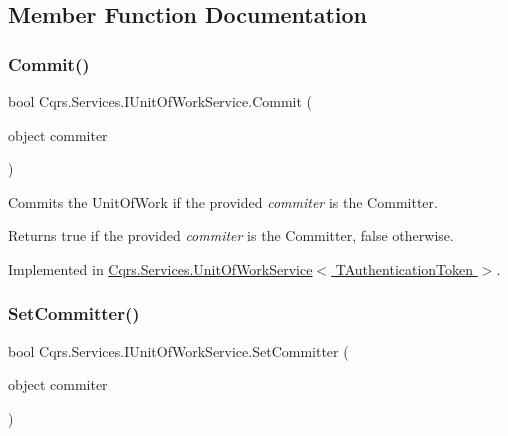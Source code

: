 \subsection{Member Function Documentation}
\mbox{\label{interfaceCqrs_1_1Services_1_1IUnitOfWorkService_a3bd8a6a931fc6f457d136d979d26cead_a3bd8a6a931fc6f457d136d979d26cead}} 
\subsubsection{\texorpdfstring{Commit()}{Commit()}}
{\footnotesize\ttfamily bool Cqrs.\+Services.\+I\+Unit\+Of\+Work\+Service.\+Commit (\begin{DoxyParamCaption}\item[{object}]{commiter }\end{DoxyParamCaption})}



Commits the Unit\+Of\+Work if the provided {\itshape commiter}  is the Committer. 

\begin{DoxyReturn}{Returns}
true if the provided {\itshape commiter}  is the Committer, false otherwise. 
\end{DoxyReturn}


Implemented in \hyperlink{classCqrs_1_1Services_1_1UnitOfWorkService_a3291740821150ecea174820ed27ee56c_a3291740821150ecea174820ed27ee56c}{Cqrs.\+Services.\+Unit\+Of\+Work\+Service$<$ T\+Authentication\+Token $>$}.

\mbox{\label{interfaceCqrs_1_1Services_1_1IUnitOfWorkService_a54f241cd90bbebf9cc73d5a296ed593b_a54f241cd90bbebf9cc73d5a296ed593b}} 
\subsubsection{\texorpdfstring{Set\+Committer()}{SetCommitter()}}
{\footnotesize\ttfamily bool Cqrs.\+Services.\+I\+Unit\+Of\+Work\+Service.\+Set\+Committer (\begin{DoxyParamCaption}\item[{object}]{commiter }\end{DoxyParamCaption})}



